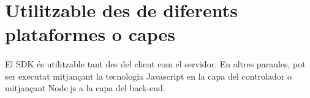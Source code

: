 \section{Utilitzable des de diferents plataformes o capes}

    \paragraph{}
    El SDK és utilitzable tant des del client com el servidor. En altres paraules, pot ser executat mitjançant la tecnologia Javascript en la capa del controlador o mitjançant Node.js a la capa del back-end. 
